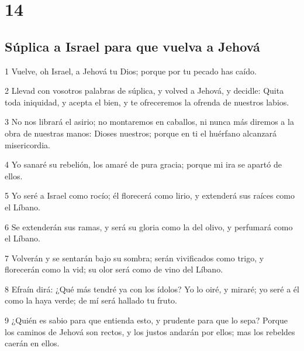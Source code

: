 \chapter{14}

\section*{Súplica a Israel para que vuelva a Jehová}

\par 1 Vuelve, oh Israel, a Jehová tu Dios; porque por tu pecado has caído.
\par 2 Llevad con vosotros palabras de súplica, y volved a Jehová, y decidle: Quita toda iniquidad, y acepta el bien, y te ofreceremos la ofrenda de nuestros labios.
\par 3 No nos librará el asirio; no montaremos en caballos, ni nunca más diremos a la obra de nuestras manos: Dioses nuestros; porque en ti el huérfano alcanzará misericordia.
\par 4 Yo sanaré su rebelión, los amaré de pura gracia; porque mi ira se apartó de ellos.
\par 5 Yo seré a Israel como rocío; él florecerá como lirio, y extenderá sus raíces como el Líbano.
\par 6 Se extenderán sus ramas, y será su gloria como la del olivo, y perfumará como el Líbano.
\par 7 Volverán y se sentarán bajo su sombra; serán vivificados como trigo, y florecerán como la vid; su olor será como de vino del Líbano.
\par 8 Efraín dirá: ¿Qué más tendré ya con los ídolos? Yo lo oiré, y miraré; yo seré a él como la haya verde; de mí será hallado tu fruto.
\par 9 ¿Quién es sabio para que entienda esto, y prudente para que lo sepa? Porque los caminos de Jehová son rectos, y los justos andarán por ellos; mas los rebeldes caerán en ellos.

